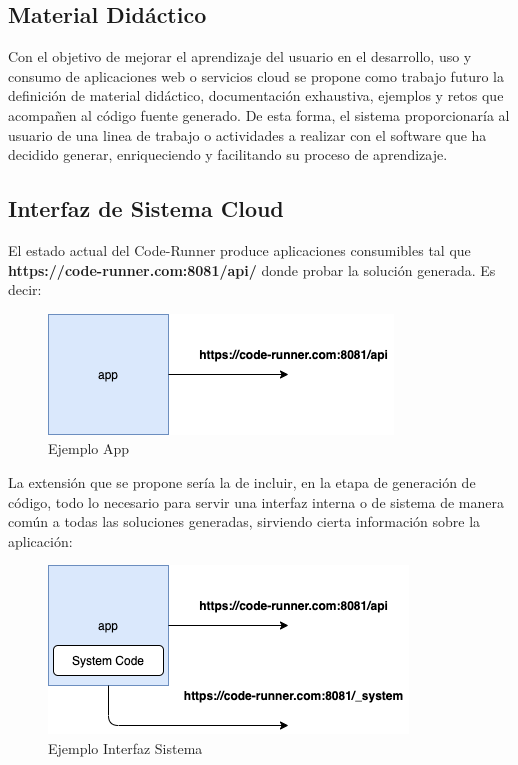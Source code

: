 \documentclass[a4paper,11pt]{book}
\begin{document}
\subsection{Material Didáctico}

Con el objetivo de mejorar el aprendizaje del usuario en el desarrollo, uso y consumo de aplicaciones web o servicios cloud se propone como trabajo futuro la definición de material didáctico, documentación exhaustiva, ejemplos y retos que acompañen al código fuente generado. De esta forma, el sistema proporcionaría al usuario de una linea de trabajo o actividades a realizar con el software que ha decidido generar, enriqueciendo y facilitando su proceso de aprendizaje. 

\subsection{Interfaz de Sistema Cloud}


El estado actual del Code-Runner produce aplicaciones consumibles tal que  \textbf{ https://code-runner.com:8081/api/}  donde probar la solución generada. Es decir: 

   \begin{figure}[H]
\centering
\includegraphics[scale=0.5]{imagenes/api.png}
\caption{ Ejemplo App  }
\end{figure}
La extensión que se propone sería la de incluir, en la etapa de generación de código, todo lo necesario para servir una interfaz interna o de sistema de manera común a todas las soluciones generadas, sirviendo  cierta información sobre la aplicación:


   \begin{figure}[H]
\centering
\includegraphics[scale=0.5]{imagenes/system.png}
\caption{ Ejemplo Interfaz Sistema  }
\end{figure}
\end{document}
